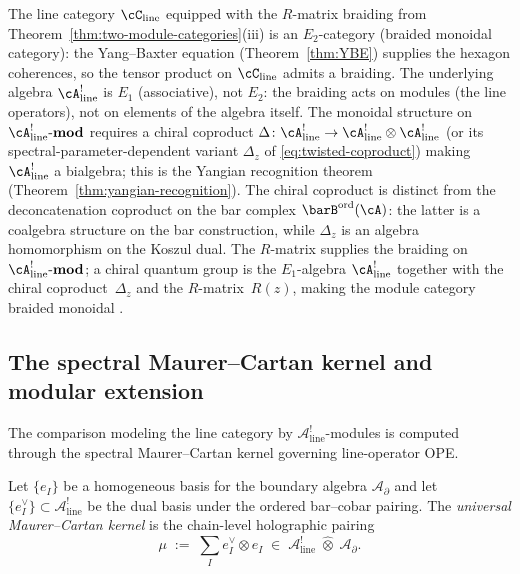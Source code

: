 \begin{remark}
\label{rem:E2-category-E1-algebra}
The line category $\cC_{\mathrm{line}}$ equipped with the $R$-matrix
braiding from Theorem~\ref{thm:two-module-categories}(iii) is an
$E_2$-category (braided monoidal category): the Yang--Baxter
equation (Theorem~\ref{thm:YBE}) supplies the hexagon coherences, so
the tensor product on $\cC_{\mathrm{line}}$ admits a braiding. The
underlying algebra $\cA^!_{\mathrm{line}}$ is $E_1$ (associative),
not $E_2$: the braiding acts on modules (the line operators), not on
elements of the algebra itself. The monoidal structure on
$\cA^!_{\mathrm{line}}\text{-}\mathbf{mod}$ requires a chiral
coproduct
$\Delta \colon \cA^!_{\mathrm{line}} \to
\cA^!_{\mathrm{line}} \otimes \cA^!_{\mathrm{line}}$
(or its spectral-parameter-dependent variant $\Delta_z$ of
\eqref{eq:twisted-coproduct}) making $\cA^!_{\mathrm{line}}$ a
bialgebra; this is the Yangian recognition theorem
(Theorem~\ref{thm:yangian-recognition}). The chiral coproduct is
distinct from the deconcatenation coproduct on the bar complex
$\barB^{\mathrm{ord}}(\cA)$: the latter is a coalgebra structure on
the bar construction, while $\Delta_z$ is an algebra homomorphism on
the Koszul dual. The $R$-matrix supplies the braiding on
$\cA^!_{\mathrm{line}}\text{-}\mathbf{mod}$; a chiral quantum group
is the $E_1$-algebra $\cA^!_{\mathrm{line}}$ together with the
chiral coproduct~$\Delta_z$ and the $R$-matrix~$R(z)$, making the
module category braided monoidal \cite{GRZ23,JKL26}.
\end{remark}

\subsection{The spectral Maurer--Cartan kernel and modular extension}
\label{subsec:spectral-mc-kernel}

The comparison modeling the line category by
$\mathcal{A}^!_{\mathrm{line}}$-modules is computed through the
spectral Maurer--Cartan kernel governing line-operator OPE.

\begin{definition}
\label{def:universal-mc-kernel}
Let $\{e_I\}$ be a homogeneous basis for the boundary algebra $\mathcal{A}_\partial$ and
let $\{e_I^\vee\} \subset \mathcal{A}^!_{\mathrm{line}}$ be the dual basis under the ordered
bar--cobar pairing.
The \emph{universal Maurer--Cartan kernel} is the chain-level holographic pairing
\begin{equation}
\label{eq:mc-kernel}
\mu \;:=\; \sum_I e_I^\vee \otimes e_I
\;\in\;
\mathcal{A}^!_{\mathrm{line}} \;\hat\otimes\; \mathcal{A}_\partial.
\end{equation}
\end{definition}

